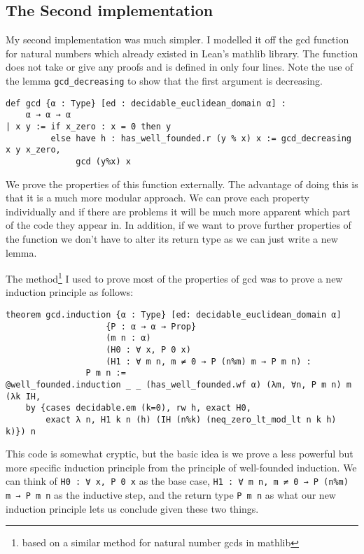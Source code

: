 \documentclass{article}
\newcommand{\ct}{\texttt}
\begin{document}
\subsection{The Second implementation}
My second implementation was much simpler. I modelled it off the gcd function for natural numbers which already existed in Lean's mathlib library. The function does not take or give any proofs and is defined in only four lines. Note the use of the lemma \ct{gcd\_decreasing} to show that the first argument is decreasing.
\begin{lstlisting}
def gcd {α : Type} [ed : decidable_euclidean_domain α] : 
    α → α → α
| x y := if x_zero : x = 0 then y
         else have h : has_well_founded.r (y % x) x := gcd_decreasing x y x_zero,
              gcd (y%x) x
\end{lstlisting}

We prove the properties of this function externally. 
The advantage of doing this is that it is a much more modular approach.
We can prove each property individually and if there are problems it will be much more apparent which part of the code they appear in.
In addition, if we want to prove further properties of the function we don't have to alter its return type as we can just write a new lemma.

The method\footnote{based on a similar method for natural number gcds in mathlib} I used to prove most of the properties of gcd was to prove a new induction principle as follows:
\begin{lstlisting}
theorem gcd.induction {α : Type} [ed: decidable_euclidean_domain α] 
                    {P : α → α → Prop}
                    (m n : α)
                    (H0 : ∀ x, P 0 x)
                    (H1 : ∀ m n, m ≠ 0 → P (n%m) m → P m n) :
                P m n := 
@well_founded.induction _ _ (has_well_founded.wf α) (λm, ∀n, P m n) m (λk IH,
    by {cases decidable.em (k=0), rw h, exact H0,
        exact λ n, H1 k n (h) (IH (n%k) (neq_zero_lt_mod_lt n k h) k)}) n
\end{lstlisting}

This code is somewhat cryptic, but the basic idea is we prove a less powerful but more specific induction principle from the principle of well-founded induction.
We can think of \lstinline{H0 : ∀ x, P 0 x} as the base case, \lstinline{H1 : ∀ m n, m ≠ 0 → P (n%m) m → P m n} as the inductive step, and the return type \ct{P m n} as what our new induction principle lets us conclude given these two things.
\end{document}
